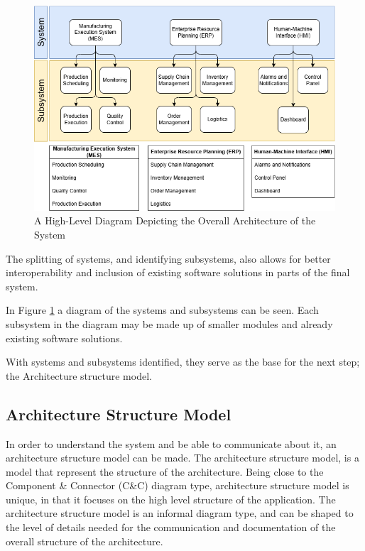 \begin{figure}[hbt]
    \centering
    \caption{\centering A High-Level Diagram Depicting the Overall Architecture of the System}
    \label{fig:systems_and_subsystems-system_diagram}
    \includegraphics[width=1\linewidth]{images/Systems&Subsystems.png}
\end{figure}


The splitting of systems, and identifying subsystems, also allows for better interoperability and inclusion of existing software solutions in parts of the final system.


In Figure \ref{fig:systems_and_subsystems-system_diagram} a diagram of the systems and subsystems can be seen.
Each subsystem in the diagram may be made up of smaller modules and already existing software solutions.


With systems and subsystems identified, they serve as the base for the next step; the Architecture structure model.

\subsection{Architecture Structure Model} %
\label{sec:architecture-structure-model}

In order to understand the system and be able to communicate about it, an architecture structure model can be made.
The architecture structure model, is a model that represent the structure of the architecture. Being close to the Component \& Connector (C\&C) diagram type, architecture structure model is unique, in that it focuses on the high level structure of the application. The architecture structure model is an informal diagram type, and can be shaped to the level of details needed for the communication and documentation of the overall structure of the architecture.

